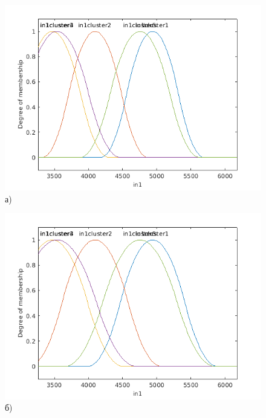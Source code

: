 \begin{figure}[H]
	\begin{minipage}[h]{0.49\linewidth}
		\centering
		\includegraphics[width=1\linewidth]{img/2sigma}
		а)\\
	\end{minipage}
	\hfill
	\begin{minipage}[h]{0.49\linewidth}
		\centering
		\includegraphics[width=1\linewidth]{img/2_5sigma}
		б)\\	
	\end{minipage}
	\vfill
	\begin{minipage}[h]{0.49\linewidth}
		\centering

\end{minipage}
\end{figure}
